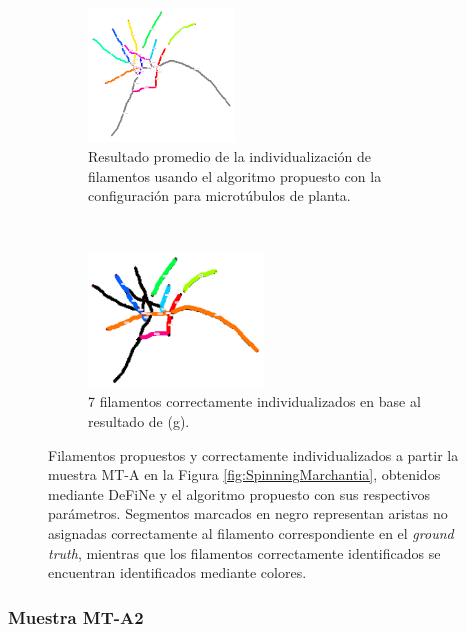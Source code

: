 \begin{figure}[h!]
    \begin{subfigure}[t]{0.49\textwidth}
        \centering
        \includegraphics[height=1.4in]{resultImages/50-ROIs-Spinning-Marchantia-phil-s10-v05-nobg-antLabeled.png}
        \caption{Resultado promedio de la individualizaci\'on de filamentos usando el algoritmo propuesto con la configuraci\'on para microt\'ubulos de planta.}
        \label{SpinningMarchantiaResults-worstPhil}
    \end{subfigure}
    ~
    \begin{subfigure}[t]{0.49\textwidth}
        \centering
        \includegraphics[height=1.4in]{resultImages/50-ROIs-Spinning-Marchantia-phil-s10-v05-exactMatch-antLabeled-thick.png}
        \caption{7 filamentos correctamente individualizados en base al resultado de (g).}
        \label{fig:SpinningMarchantiaResults-worstPhilExact}
    \end{subfigure}
    
    \caption[Filamentos propuestos y correctamente individualizados a partir la muestra MT-A en la Figura \ref{fig:SpinningMarchantia}.]{Filamentos propuestos y correctamente individualizados a partir la muestra MT-A en la Figura \ref{fig:SpinningMarchantia}, obtenidos mediante DeFiNe y el algoritmo propuesto con sus respectivos par\'ametros. Segmentos marcados en negro representan aristas no asignadas correctamente al filamento correspondiente en el {\it ground truth}, mientras que los filamentos correctamente identificados se encuentran identificados mediante colores.}
    \label{fig:SpinningMarchantiaResults}
\end{figure}

\clearpage
\newpage

\subsubsection{Muestra MT-A2}



